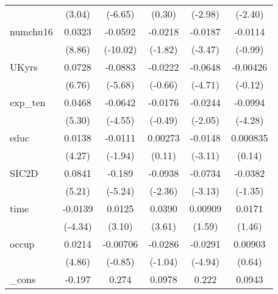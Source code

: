 \begin{table}[htbp]
\begin{tabular}{l*{5}{c}}
            &      (3.04)         &     (-6.65)         &      (0.30)         &     (-2.98)         &     (-2.40)         \\
numchu16    &      0.0323\sym{***}&     -0.0592\sym{***}&     -0.0218         &     -0.0187\sym{***}&     -0.0114         \\
            &      (8.86)         &    (-10.02)         &     (-1.82)         &     (-3.47)         &     (-0.99)         \\
UKyrs       &      0.0728\sym{***}&     -0.0883\sym{***}&     -0.0222         &     -0.0648\sym{***}&    -0.00426         \\
            &      (6.76)         &     (-5.68)         &     (-0.66)         &     (-4.71)         &     (-0.12)         \\
exp\_ten     &      0.0468\sym{***}&     -0.0642\sym{***}&     -0.0176         &     -0.0244\sym{*}  &     -0.0994\sym{***}\\
            &      (5.30)         &     (-4.55)         &     (-0.49)         &     (-2.05)         &     (-4.28)         \\
educ        &      0.0138\sym{***}&     -0.0111         &     0.00273         &     -0.0148\sym{**} &    0.000835         \\
            &      (4.27)         &     (-1.94)         &      (0.11)         &     (-3.11)         &      (0.14)         \\
SIC2D       &      0.0841\sym{***}&      -0.189\sym{***}&     -0.0938\sym{*}  &     -0.0734\sym{**} &     -0.0382         \\
            &      (5.21)         &     (-5.24)         &     (-2.36)         &     (-3.13)         &     (-1.35)         \\
time        &     -0.0139\sym{***}&      0.0125\sym{**} &      0.0390\sym{***}&     0.00909         &      0.0171         \\
            &     (-4.34)         &      (3.10)         &      (3.61)         &      (1.59)         &      (1.46)         \\
occup       &      0.0214\sym{***}&    -0.00706         &     -0.0286         &     -0.0291\sym{***}&     0.00903         \\
            &      (4.86)         &     (-0.85)         &     (-1.04)         &     (-4.94)         &      (0.64)         \\
\_cons      &      -0.197\sym{***}&       0.274\sym{***}&      0.0978         &       0.222\sym{***}&      0.0943\sym{*}  \\

\end{tabular}
\end{table}
